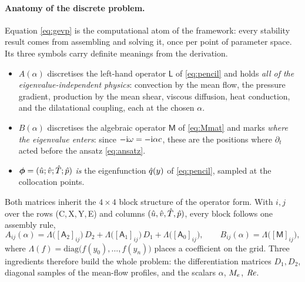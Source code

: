 \documentclass[11pt]{article}
\begin{document}
\paragraph{Anatomy of the discrete problem.} Equation \eqref{eq:gevp} is the computational atom of
the framework: every stability result comes from assembling and solving it, once per point of
parameter space. Its three symbols carry definite meanings from the derivation.
\begin{itemize}[nosep,leftmargin=1.6em]
  \item $A(\alpha)$ discretises the left-hand operator $\mathsf L$ of \eqref{eq:pencil} and holds
        \emph{all of the eigenvalue-independent physics}: convection by the mean flow, the pressure
        gradient, production by the mean shear, viscous diffusion, heat conduction, and the
        dilatational coupling, each at the chosen $\alpha$.
  \item $B(\alpha)$ discretises the algebraic operator $\mathsf M$ of \eqref{eq:Mmat} and marks
        \emph{where the eigenvalue enters}: since $-\mathrm{i}\omega=-\mathrm{i}\alpha c$, these are the
        positions where $\partial_t$ acted before the ansatz \eqref{eq:ansatz}.
  \item $\boldsymbol\phi=(\hat{u};\hat{v};\hat{T};\hat{p})$ \emph{is} the eigenfunction $\hat{q}(y)$ of
        \eqref{eq:pencil}, sampled at the collocation points.
\end{itemize}
Both matrices inherit the $4\times4$ block structure of the operator form. With $i,j$ over the rows
(C,\,X,\,Y,\,E) and columns $(\hat{u},\hat{v},\hat{T},\hat{p})$, every block follows one assembly rule,
\begin{equation}\label{eq:blocks}
  A_{ij}(\alpha)=\Lambda\big([\mathsf A_2]_{ij}\big)\,D_2+\Lambda\big([\mathsf A_1]_{ij}\big)\,D_1
  +\Lambda\big([\mathsf A_0]_{ij}\big),
  \qquad
  B_{ij}(\alpha)=\Lambda\big([\mathsf M]_{ij}\big),
\end{equation}
where $\Lambda(f)=\mathrm{diag}\big(f(y_0),\dots,f(y_n)\big)$ places a coefficient on the grid. Three
ingredients therefore build the whole problem: the differentiation matrices $D_1,D_2$, diagonal
samples of the mean-flow profiles, and the scalars $\alpha$, $M_e$, $\mathit{Re}$.
\end{document}
